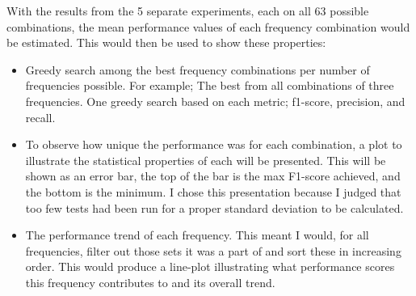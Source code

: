         With the results from the 5 separate experiments, each on all 63 possible combinations, the mean performance values of each frequency combination would be estimated. This would then be used to show these properties:
        \begin{itemize}

            \item Greedy search among the best frequency combinations per number of frequencies possible. For example; The best from all combinations of three frequencies. One greedy search based on each metric; f1-score, precision, and recall.
            \item To observe how unique the performance was for each combination, a plot to illustrate the statistical properties of each will be presented. This will be shown as an error bar, the top of the bar is the max F1-score achieved, and the bottom is the minimum. I chose this presentation because I judged that too few tests had been run for a proper standard deviation to be calculated.
            \item The performance trend of each frequency. This meant I would, for all frequencies, filter out those sets it was a part of and sort these in increasing order. This would produce a line-plot illustrating what performance scores this frequency contributes to and its overall trend.
        \end{itemize}